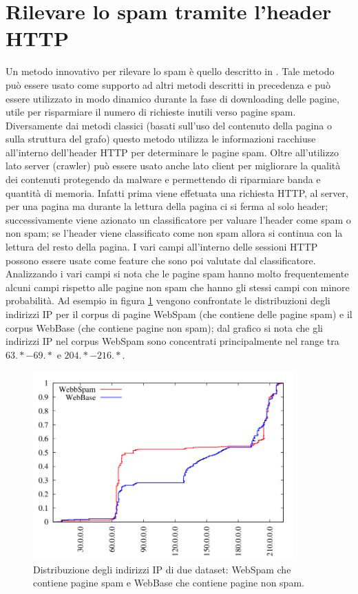 \section{Rilevare lo spam tramite l'header HTTP}
Un metodo innovativo per rilevare lo spam è quello descritto in \cite{Webb:2008:PWS:1458082.1458129}. Tale metodo può essere usato come supporto ad altri metodi descritti in precedenza e può essere utilizzato in modo dinamico durante la fase di downloading delle pagine, utile per risparmiare il numero di richieste inutili verso pagine spam. Diversamente dai metodi classici (basati sull'uso del contenuto della pagina o sulla struttura del grafo) questo metodo utilizza le informazioni racchiuse all'interno dell'header HTTP per determinare le pagine spam. Oltre all'utilizzo lato server (crawler) può essere usato anche lato client per migliorare la qualità dei contenuti protegendo da malware e permettendo di riparmiare banda e quantità di memoria. Infatti prima viene effetuata una richiesta HTTP, al server, per una pagina ma durante la lettura della pagina ci si ferma al solo header; successivamente viene azionato un classificatore per valuare l'header come spam o non spam; se l'header viene classificato come 
non spam allora si continua con la lettura del resto della pagina. I vari campi all'interno delle sessioni HTTP possono essere usate come feature che sono poi valutate dal classificatore. Analizzando i vari campi si nota che le pagine spam hanno molto frequentemente alcuni campi rispetto alle pagine non spam che hanno gli stessi campi con minore probabilità. Ad esempio in figura \ref{img:webb1} vengono confrontate le distribuzioni degli indirizzi IP per il corpus di pagine WebSpam (che contiene delle pagine spam) e il corpus WebBase (che contiene pagine non spam); dal grafico si nota che gli indirizzi IP nel corpus WebSpam sono concentrati principalmente nel range tra \(63.* - 69.*\) e \(204.* - 216.*\).
\begin{figure}
\centering
\includegraphics[width=10cm]{immagini/altre/webb.png}
\caption{Distribuzione degli indirizzi IP di due dataset: WebSpam che contiene pagine spam e WebBase che contiene pagine non spam.}
\label{img:webb1}
\end{figure}
